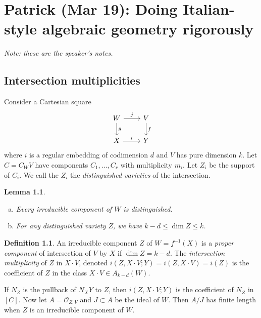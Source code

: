 \documentclass[leqno, openany]{memoir}
\newtheorem{lem}[thm]{Lemma}
\theoremstyle{definition}
\newtheorem{defn}[thm]{Definition}
\theoremstyle{remark}
\theoremstyle{plain}
\theoremstyle{definition}
\theoremstyle{remark}
\newcommand{\mc}[1]{\mathcal{#1}}
\begin{document}
\chapter{Patrick (Mar 19): Doing Italian-style algebraic geometry rigorously}%
\label{cha:patrick_mar_19_doing_italian_style_algebraic_geometry_rigorously}

\textit{Note: these are the speaker's notes.} 

\section{Intersection multiplicities}%
\label{sec:intersection_multiplicities}

Consider a Cartesian square
\begin{equation*}
\begin{tikzcd}
    W \ar{r}{j} \ar{d}{g} & V \ar{d}{f} \\
    X \ar{r}{i} & Y
\end{tikzcd}
\end{equation*}
where $i$ is a regular embedding of codimension $d$ and $V$ has pure dimension $k$. Let $C = C_W V$ have components $C_1, \ldots, C_r$ with multiplicity $m_i$. Let $Z_i$ be the support of $C_i$. We call the $Z_i$ the \textit{distinguished varieties} of the intersection.

\begin{lem}\leavevmode
    \begin{enumerate}[(a)]
        \item Every irreducible component of $W$ is distinguished.
        \item For any distinguished variety $Z$, we have $k-d \leq \dim Z \leq k$.
    \end{enumerate}
\end{lem}

\begin{defn}
    An irreducible component $Z$ of $W = f^{-1}(X)$ is a \textit{proper component} of intersection of $V$ by $X$ if $\dim Z = k-d$. The \textit{intersection multiplicity} of $Z$ in $X \cdot V$, denoted $i(Z, X \cdot V; Y) = i(Z, X \cdot V) = i(Z)$ is the coefficient of $Z$ in the class $X \cdot V \in A_{k-d}(W)$. 
\end{defn}

If $N_Z$ is the pullback of $N_X Y$ to $Z$, then $i(Z,X\cdot V; Y)$ is the coefficient of $N_Z$ in $[C]$. Now let $A = \mc{O}_{Z,V}$ and $J \subset A$ be the ideal of $W$. Then $A/J$ has finite length when $Z$ is an irreducible component of $W$.
\end{document}

